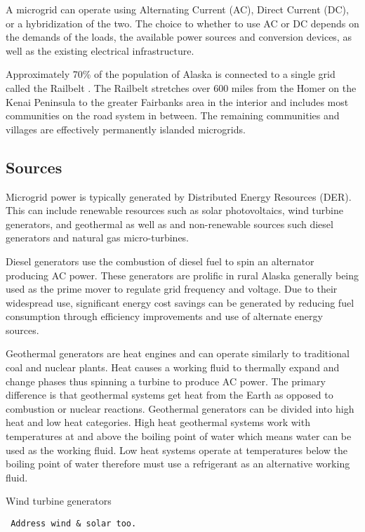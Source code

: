 A microgrid can operate using Alternating Current (AC), Direct Current (DC), or a hybridization of the two. The choice to whether to use AC or DC depends on the demands of the loads, the available power sources and conversion devices, as well as the existing electrical infrastructure.

Approximately 70\% of the population of Alaska is connected to a single grid called the Railbelt \cite{railbelt}. The Railbelt stretches over 600 miles from the Homer on the Kenai Peninsula to the greater Fairbanks area in the interior and includes most communities on the road system in between. The remaining communities and villages are effectively permanently islanded microgrids. 

\subsection{Sources}
Microgrid power is typically generated by Distributed Energy Resources (DER). This can include renewable resources such as solar photovoltaics, wind turbine generators, and geothermal as well as and non-renewable sources such diesel generators and natural gas micro-turbines. 

Diesel generators use the combustion of diesel fuel to spin an alternator producing AC power. These generators are prolific in rural Alaska generally being used as the prime mover to regulate grid frequency and voltage. 
Due to their widespread use, significant energy cost savings can be generated by reducing fuel consumption through efficiency improvements and use of alternate energy sources.

Geothermal generators are heat engines and can operate similarly to traditional coal and nuclear plants. Heat causes a working fluid to thermally expand and change phases thus spinning a turbine to produce AC power. The primary difference is that geothermal systems get heat from the Earth as opposed to combustion or nuclear reactions. Geothermal generators can be divided into high heat and low heat categories. High heat geothermal systems work with temperatures at and above the boiling point of water which means water can be used as the working fluid. Low heat systems operate at temperatures below the boiling point of water therefore must use a refrigerant as an alternative working fluid. 

Wind turbine generators 
\begin{verbatim} 
 Address wind & solar too.
\end{verbatim}

